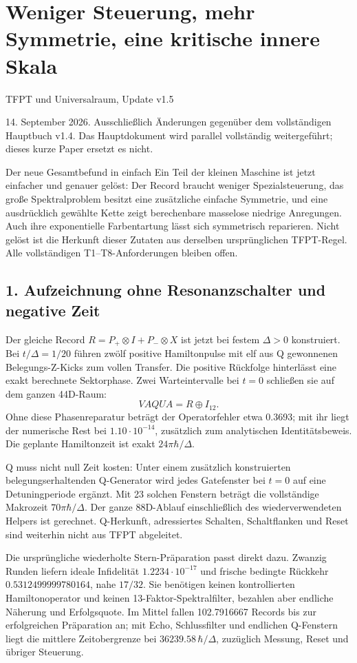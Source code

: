 \chapter*{Weniger Steuerung, mehr Symmetrie, eine kritische innere Skala}
{\sffamily\large TFPT und Universalraum, Update v1.5}\par
14. September 2026. Ausschließlich Änderungen gegenüber dem vollständigen Hauptbuch v1.4. Das Hauptdokument wird parallel vollständig weitergeführt; dieses kurze Paper ersetzt es nicht.

\begin{bild}{Der neue Gesamtbefund in einfach}
Ein Teil der kleinen Maschine ist jetzt einfacher und genauer gelöst: Der Record braucht weniger Spezialsteuerung, das große Spektralproblem besitzt eine zusätzliche einfache Symmetrie, und eine ausdrücklich gewählte Kette zeigt berechenbare masselose niedrige Anregungen. Auch ihre exponentielle Farbentartung lässt sich symmetrisch reparieren. Nicht gelöst ist die Herkunft dieser Zutaten aus derselben ursprünglichen TFPT-Regel. Alle vollständigen T1--T8-Anforderungen bleiben offen.
\end{bild}

\section*{1. Aufzeichnung ohne Resonanzschalter und negative Zeit}
Der gleiche Record $R=P_+\otimes I+P_-\otimes X$ ist jetzt bei festem $\Delta>0$ konstruiert. Bei $t/\Delta=1/20$ führen zwölf positive Hamiltonpulse mit elf aus Q gewonnenen Belegungs-Z-Kicks zum vollen Transfer. Die positive Rückfolge hinterlässt eine exakt berechnete Sektorphase. Zwei Warteintervalle bei $t=0$ schließen sie auf dem ganzen 44D-Raum:
\[
VAQUA=R\oplus I_{12}.
\]
Ohne diese Phasenreparatur beträgt der Operatorfehler etwa 0.3693; mit ihr liegt der numerische Rest bei $1.10\cdot10^{-14}$, zusätzlich zum analytischen Identitätsbeweis. Die geplante Hamiltonzeit ist exakt $24\pi\hbar/\Delta$.

Q muss nicht null Zeit kosten: Unter einem zusätzlich konstruierten belegungserhaltenden Q-Generator wird jedes Gatefenster bei $t=0$ auf eine Detuningperiode ergänzt. Mit 23 solchen Fenstern beträgt die vollständige Makrozeit $70\pi\hbar/\Delta$. Der ganze 88D-Ablauf einschließlich des wiederverwendeten Helpers ist gerechnet. Q-Herkunft, adressiertes Schalten, Schaltflanken und Reset sind weiterhin nicht aus TFPT abgeleitet.

Die ursprüngliche wiederholte Stern-Präparation passt direkt dazu. Zwanzig Runden liefern ideale Infidelität $1.2234\cdot10^{-17}$ und frische bedingte Rückkehr $0.5312499999780164$, nahe $17/32$. Sie benötigen keinen kontrollierten Hamiltonoperator und keinen 13-Faktor-Spektralfilter, bezahlen aber endliche Näherung und Erfolgsquote. Im Mittel fallen 102.7916667 Records bis zur erfolgreichen Präparation an; mit Echo, Schlussfilter und endlichen Q-Fenstern liegt die mittlere Zeitobergrenze bei $36239.58\,\hbar/\Delta$, zuzüglich Messung, Reset und übriger Steuerung.

